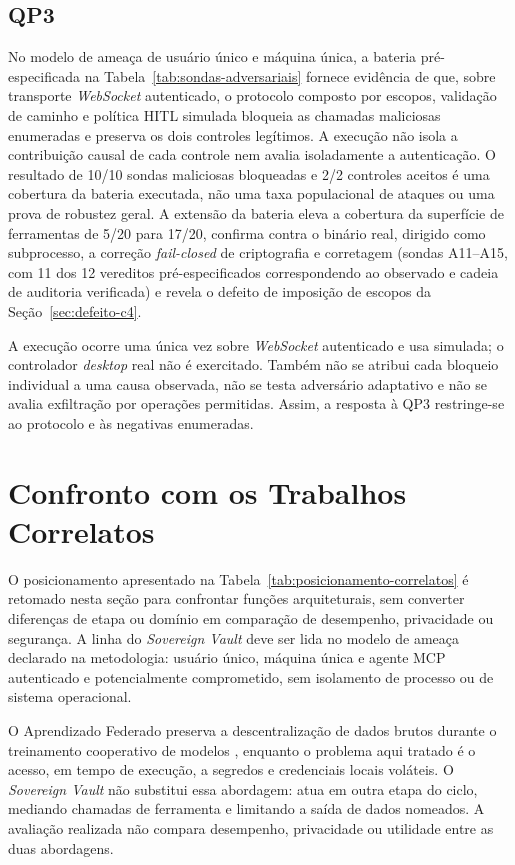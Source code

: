 \subsection{QP3}
No modelo de ameaça de usuário único e máquina única, a bateria pré-especificada na Tabela~\ref{tab:sondas-adversariais} fornece evidência de que, sobre transporte \textit{WebSocket} autenticado, o protocolo composto por escopos, validação de caminho e política HITL simulada bloqueia as chamadas maliciosas enumeradas e preserva os dois controles legítimos. A execução não isola a contribuição causal de cada controle nem avalia isoladamente a autenticação. O resultado de 10/10 sondas maliciosas bloqueadas e 2/2 controles aceitos é uma cobertura da bateria executada, não uma taxa populacional de ataques ou uma prova de robustez geral. A extensão da bateria eleva a cobertura da superfície de ferramentas de 5/20 para 17/20, confirma contra o binário real, dirigido como subprocesso, a correção \textit{fail-closed} de criptografia e corretagem (sondas A11--A15, com 11 dos 12 vereditos pré-especificados correspondendo ao observado e cadeia de auditoria verificada) e revela o defeito de imposição de escopos da Seção~\ref{sec:defeito-c4}.

A execução ocorre uma única vez sobre \textit{WebSocket} autenticado e usa  simulada; o controlador \textit{desktop} real  não é exercitado. Também não se atribui cada bloqueio individual a uma causa observada, não se testa adversário adaptativo e não se avalia exfiltração por operações permitidas. Assim, a resposta à QP3 restringe-se ao protocolo e às negativas enumeradas.

\section{Confronto com os Trabalhos Correlatos}
O posicionamento apresentado na Tabela~\ref{tab:posicionamento-correlatos} é retomado nesta seção para confrontar funções arquiteturais, sem converter diferenças de etapa ou domínio em comparação de desempenho, privacidade ou segurança. A linha do \textit{Sovereign Vault} deve ser lida no modelo de ameaça declarado na metodologia: usuário único, máquina única e agente MCP autenticado e potencialmente comprometido, sem isolamento de processo ou de sistema operacional.

O Aprendizado Federado preserva a descentralização de dados brutos durante o treinamento cooperativo de modelos \cite{mcmahan2017,mammen2021}, enquanto o problema aqui tratado é o acesso, em tempo de execução, a segredos e credenciais locais voláteis. O \textit{Sovereign Vault} não substitui essa abordagem: atua em outra etapa do ciclo, mediando chamadas de ferramenta e limitando a saída de dados nomeados. A avaliação realizada não compara desempenho, privacidade ou utilidade entre as duas abordagens.

